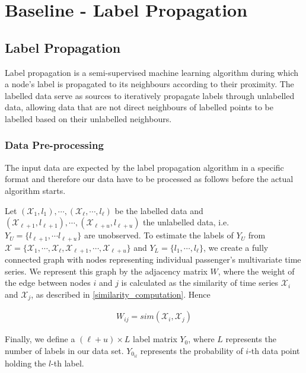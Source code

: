 \chapter{Baseline - Label Propagation}\label{chap:base}
\section{Label Propagation}
\label{sec:label_prop}
\par
Label propagation is a semi-supervised machine learning algorithm during which a node's label is propagated to its neighbours according to their proximity. The labelled data serve as sources to iteratively propagate labels through unlabelled data, allowing data that are not direct neighbours of labelled points to be labelled based on their unlabelled neighbours.\\

\subsection{Data Pre-processing}
\par
The input data are expected by the label propagation algorithm in a specific format and therefore our data have to be processed as follows before the actual algorithm starts.\\

\par
Let $(\mathcal{X}_1, l_1), \cdots, (\mathcal{X}_\ell, \cdots, l_\ell)$ be the labelled data and $(\mathcal{X}_{\ell+1}, l_{\ell+1}),\cdots,(\mathcal{X}_{\ell+u}, l_{\ell+u})$ the unlabelled data, i.e. $Y_U = \{l_{\ell+1}, \cdots l_{\ell+u} \}$ are unobserved. To estimate the labels of $Y_U$ from $\mathcal{X} = \{ \mathcal{X}_1,\cdots, \mathcal{X}_\ell, \mathcal{X}_{\ell+1},\cdots, \mathcal{X}_{\ell+u} \}$ and $Y_L = \{ l_1,\cdots, l_{\ell} \}$, we create a fully connected graph with nodes representing individual passenger's multivariate time series. We represent this graph by the adjacency matrix $W$, where the weight of the edge between nodes $i$ and $j$ is calculated as the similarity of time series $\mathcal{X}_i$ and $\mathcal{X}_j$, as described in \ref{similarity_computation}. Hence

\begin{align*}
    W_{ij} = sim(\mathcal{X}_i, \mathcal{X}_j)
\end{align*}

\par
Finally, we define a $(\ell+u)\times L$ label matrix $Y_0$, where $L$ represents the number of labels in our data set. $Y_{0_{il}}$ represents the probability of $i$-th data point holding the $l$-th label.\\


